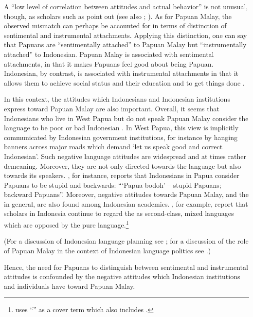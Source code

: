 A  ``low level of correlation between attitudes and actual behavior'' is not unusual, though, as scholars such as \citet[140]{Agheyisi.1970} point out (see also \citealt[10]{Cooper.1974}; \citealt[16]{Baker.1992}). As for Papuan Malay, the observed mismatch can perhaps be accounted for in terms of  distinction of sentimental and instrumental attachments. Applying this distinction, one can say that Papuans are  ``sentimentally attached'' to Papuan Malay but  ``instrumentally attached'' to Indonesian. Papuan Malay is associated with sentimental attachments, in that it makes Papuans feel good about being Papuan. Indonesian, by contrast, is associated with instrumental attachments in that it allows them to achieve social status and their education and to get things done \citep[25]{Kelman.1971}.


\newpage
In this context, the attitudes which Indonesians and Indonesian institutions express toward Papuan Malay are also important. Overall, it seems that Indonesians who live in West Papua but do not speak Papuan Malay consider the language to be poor or bad Indonesian \citep[19]{Scott.2008}. In West Papua, this view is implicitly communicated by Indonesian government institutions, for instance by hanging banners across major roads which demand  ‘let us speak good and correct Indonesian’. Such negative language attitudes are widespread and at times rather demeaning. Moreover, they are not only directed towards the language but also towards its speakers. \citet[94]{King.2002}, for instance, reports that Indonesians in Papua consider Papuans to be stupid and backwards:  ``‘Papua bodoh’ – stupid Papuans; backward Papuans''. Moreover, negative attitudes towards Papuan Malay, and the  in general, are also found among Indonesian academics. \citet[106]{Masinambow.2002}, for example, report that scholars in Indonesia continue to regard the  as second-class, mixed languages which are opposed by the pure  language.\footnote{\citet{Masinambow.2002} uses  ``'' as a cover term which also includes .}

(For a discussion of Indonesian language planning see \citealt[114–143]{Sneddon.2003}; for a discussion of the role of Papuan Malay in the context of Indonesian language politics see \citealt[13–17]{Besier.2012}.)

Hence, the need for Papuans to distinguish between sentimental and instrumental attitudes is confounded by the negative attitudes which Indonesian institutions and individuals have toward Papuan Malay.



